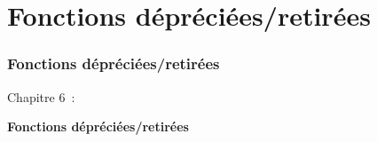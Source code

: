 %

\section{Fonctions dépréciées/retirées}
\begin{frame}[fragile]
	\frametitle{Fonctions dépréciées/retirées}

	\begin{center}\huge{Chapitre 6~:}\end{center}
	\begin{center}\huge{\color{typo3darkgrey}\textbf{Fonctions dépréciées/retirées}}\end{center}

\end{frame}


